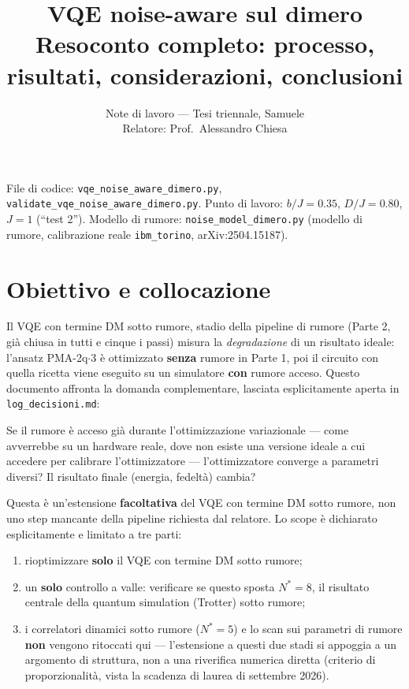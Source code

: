 \documentclass[11pt,a4paper]{article}
\title{\vspace{-1.5em}\color{inkblue}VQE noise-aware sul dimero\\[0.2em]
\Large\normalfont\color{softgray}Resoconto completo: processo, risultati, considerazioni, conclusioni}
\author{Note di lavoro --- Tesi triennale, Samuele\\ Relatore: Prof.\ Alessandro Chiesa}
\date{}
\begin{document}
\sloppy
\maketitle
\thispagestyle{fancy}
\vspace{-2.0em}

File di codice: \texttt{vqe\_noise\_aware\_dimero.py},
\texttt{validate\_vqe\_noise\_aware\_dimero.py}. Punto di lavoro:
$b/J=0.35$, $D/J=0.80$, $J=1$ (``test 2''). Modello di rumore:
\texttt{noise\_model\_dimero.py} (modello di rumore, calibrazione reale
\texttt{ibm\_torino}, arXiv:2504.15187).

\tableofcontents

\section{Obiettivo e collocazione}

Il VQE con termine DM sotto rumore, stadio della pipeline di rumore
(Parte 2, già chiusa in tutti e
cinque i passi) misura la \emph{degradazione} di un risultato ideale:
l'ansatz PMA-2q$\cdot$3 è ottimizzato \textbf{senza} rumore in Parte 1,
poi il circuito con quella ricetta viene eseguito su un simulatore
\textbf{con} rumore acceso. Questo documento affronta la domanda
complementare, lasciata esplicitamente aperta in \texttt{log\_decisioni.md}:

\begin{keyeq}
\centering
Se il rumore è acceso già durante l'ottimizzazione variazionale --- come
avverrebbe su un hardware reale, dove non esiste una versione ideale a
cui accedere per calibrare l'ottimizzatore --- l'ottimizzatore converge a
parametri diversi? Il risultato finale (energia, fedeltà) cambia?
\end{keyeq}

Questa è un'estensione \textbf{facoltativa} del VQE con termine DM
sotto rumore, non uno step
mancante della pipeline richiesta dal relatore. Lo scope è dichiarato
esplicitamente e limitato a tre parti:
\begin{enumerate}[leftmargin=1.4em,itemsep=0.2em]
\item rioptimizzare \textbf{solo} il VQE con termine DM sotto rumore;
\item un \textbf{solo} controllo a valle: verificare se questo sposta
$N^*=8$, il risultato centrale della quantum simulation (Trotter)
sotto rumore;
\item i correlatori dinamici sotto rumore ($N^*=5$) e lo scan sui
parametri di rumore \textbf{non} vengono ritoccati qui --- l'estensione
a questi due stadi si appoggia a un argomento di struttura, non a una riverifica
numerica diretta (criterio di proporzionalità, vista la scadenza di
laurea di settembre 2026).
\end{enumerate}
\end{document}
